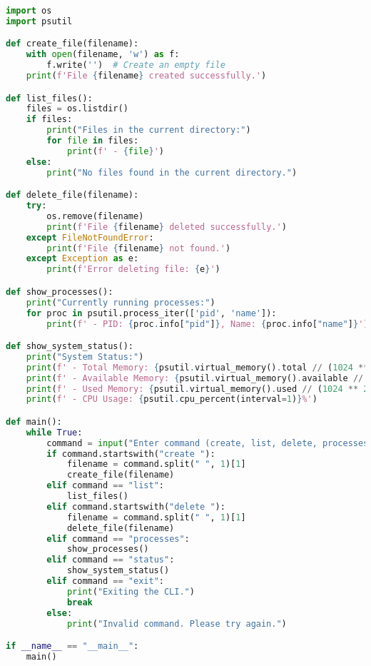 \documentclass[12pt]{article}
\begin{document}
\begin{lstlisting}[language=Python]
import os
import psutil

def create_file(filename):
    with open(filename, 'w') as f:
        f.write('')  # Create an empty file
    print(f'File {filename} created successfully.')

def list_files():
    files = os.listdir()
    if files:
        print("Files in the current directory:")
        for file in files:
            print(f' - {file}')
    else:
        print("No files found in the current directory.")

def delete_file(filename):
    try:
        os.remove(filename)
        print(f'File {filename} deleted successfully.')
    except FileNotFoundError:
        print(f'File {filename} not found.')
    except Exception as e:
        print(f'Error deleting file: {e}')

def show_processes():
    print("Currently running processes:")
    for proc in psutil.process_iter(['pid', 'name']):
        print(f' - PID: {proc.info["pid"]}, Name: {proc.info["name"]}')

def show_system_status():
    print("System Status:")
    print(f' - Total Memory: {psutil.virtual_memory().total // (1024 ** 2)} MB')
    print(f' - Available Memory: {psutil.virtual_memory().available // (1024 ** 2)} MB')
    print(f' - Used Memory: {psutil.virtual_memory().used // (1024 ** 2)} MB')
    print(f' - CPU Usage: {psutil.cpu_percent(interval=1)}%')

def main():
    while True:
        command = input("Enter command (create, list, delete, processes, status, exit): ").strip().lower()
        if command.startswith("create "):
            filename = command.split(" ", 1)[1]
            create_file(filename)
        elif command == "list":
            list_files()
        elif command.startswith("delete "):
            filename = command.split(" ", 1)[1]
            delete_file(filename)
        elif command == "processes":
            show_processes()
        elif command == "status":
            show_system_status()
        elif command == "exit":
            print("Exiting the CLI.")
            break
        else:
            print("Invalid command. Please try again.")

if __name__ == "__main__":
    main()
\end{lstlisting}
\end{document}
